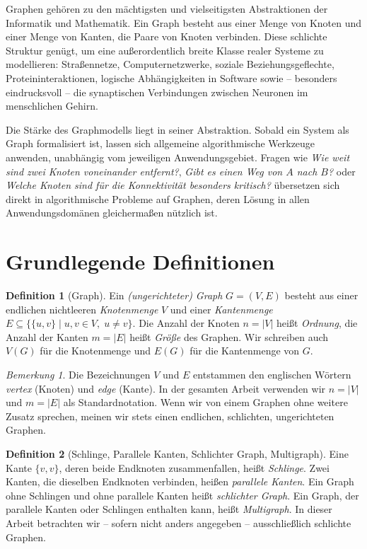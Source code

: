 ﻿\documentclass[a4paper,12pt,openany,oneside]{book}
\theoremstyle{definition}
\newtheorem{definition}{Definition}[chapter]
\theoremstyle{plain}
\theoremstyle{remark}
\newtheorem{bemerkung}{Bemerkung}[chapter]
\begin{document}
Graphen geh\"oren zu den m\"achtigsten und vielseitigsten Abstraktionen der
Informatik und Mathematik. Ein Graph besteht aus einer Menge von Knoten und
einer Menge von Kanten, die Paare von Knoten verbinden. Diese schlichte
Struktur gen\"ugt, um eine au\ss{}erordentlich breite Klasse realer Systeme
zu modellieren: Stra\ss{}ennetze, Computernetzwerke, soziale Beziehungsgeflechte,
Proteininteraktionen, logische Abh\"angigkeiten in Software sowie -- besonders
eindrucksvoll -- die synaptischen Verbindungen zwischen Neuronen im menschlichen
Gehirn.

Die St\"arke des Graphmodells liegt in seiner Abstraktion. Sobald ein System
als Graph formalisiert ist, lassen sich allgemeine algorithmische Werkzeuge
anwenden, unabh\"angig vom jeweiligen Anwendungsgebiet. Fragen wie \emph{Wie
weit sind zwei Knoten voneinander entfernt?}, \emph{Gibt es einen Weg von $A$
nach $B$?} oder \emph{Welche Knoten sind f\"ur die Konnektivit\"at besonders
kritisch?} \"ubersetzen sich direkt in algorithmische Probleme auf Graphen,
deren L\"osung in allen Anwendungsdom\"anen gleicherma\ss{}en n\"utzlich ist.

\section{Grundlegende Definitionen}

\begin{definition}[Graph]
  Ein \emph{(ungerichteter) Graph} $G = (V, E)$ besteht aus einer endlichen
  nichtleeren \emph{Knotenmenge} $V$ und einer \emph{Kantenmenge}
  $E \subseteq \bigl\{\{u,v\} \mid u,v \in V,\; u \neq v\bigr\}$.
  Die Anzahl der Knoten $n = |V|$ hei\ss{}t \emph{Ordnung}, die Anzahl der
  Kanten $m = |E|$ hei\ss{}t \emph{Gr\"o\ss{}e} des Graphen. Wir schreiben auch
  $V(G)$ f\"ur die Knotenmenge und $E(G)$ f\"ur die Kantenmenge von $G$.
\end{definition}

\begin{bemerkung}
  Die Bezeichnungen $V$ und $E$ entstammen den englischen W\"ortern
  \emph{vertex} (Knoten) und \emph{edge} (Kante). In der gesamten Arbeit
  verwenden wir $n = |V|$ und $m = |E|$ als Standardnotation. Wenn wir von
  einem Graphen ohne weitere Zusatz sprechen, meinen wir stets einen
  endlichen, schlichten, ungerichteten Graphen.
\end{bemerkung}

\begin{definition}[Schlinge, Parallele Kanten, Schlichter Graph, Multigraph]
  Eine Kante $\{v,v\}$, deren beide Endknoten zusammenfallen, hei\ss{}t
  \emph{Schlinge}. Zwei Kanten, die dieselben Endknoten verbinden, hei\ss{}en
  \emph{parallele Kanten}. Ein Graph ohne Schlingen und ohne parallele Kanten
  hei\ss{}t \emph{schlichter Graph}. Ein Graph, der parallele Kanten oder
  Schlingen enthalten kann, hei\ss{}t \emph{Multigraph}. In dieser Arbeit
  betrachten wir -- sofern nicht anders angegeben -- ausschlie\ss{}lich
  schlichte Graphen.
\end{definition}
\end{document}
